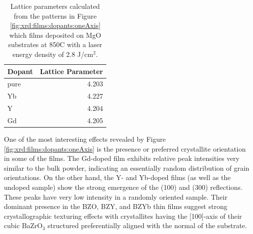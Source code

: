 \begin{table}[b]
    \centering
    \caption{Lattice parameters calculated from the patterns in Figure \ref{fig:xrd:films:dopants:oneAxis} which films deposited on MgO substrates at 850\textdegree C with a laser energy density of 2.8 J/cm$^2$. }
    \begin{tabular}{lr}
        \toprule
        Dopant &  Lattice Parameter \\
        \midrule
        \midrule
          pure &              4.203 \\
            Yb &              4.227 \\
             Y &              4.204 \\
            Gd &              4.205 \\
        \bottomrule
    \end{tabular}
    \label{tab:film:dopant:latticeParam}
\end{table}

One of the most interesting effects revealed by Figure \ref{fig:xrd:films:dopants:oneAxis} is the presence or preferred crystallite orientation in some of the films. The Gd-doped film exhibits relative peak intensities very similar to the bulk powder, indicating an essentially random distribution of grain orientations. On the other hand, the Y- and Yb-doped films (as well as the undoped sample) show the strong emergence of the (100) and (300) reflections. These peaks have very low intensity in a randomly oriented sample. Their dominant presence in the BZO, BZY, and BZYb thin films suggest strong crystallographic texturing effects with crystallites having the [100]-axis of their cubic BaZrO$_3$ structured preferentially aligned with the normal of the substrate. 

